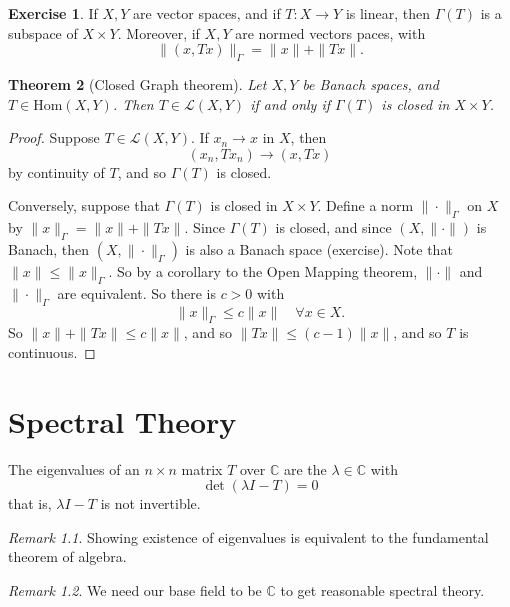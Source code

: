 \documentclass[10pt, oneside, reqno]{amsbook}
\theoremstyle{plain}%
\newtheorem{thm}{Theorem}[section]
\theoremstyle{definition}
\newtheorem{exer}[thm]{Exercise}
\theoremstyle{remark}
\newtheorem*{rem}{Remark}
\newcommand{\Com}{\mathbb{C}}
\begin{document}

\begin{exer}
    If $X, Y$ are vector spaces, and if $T: X \rightarrow Y$ is linear, then $\Gamma(T)$ is a subspace of $X \times Y$.  Moreover, if $X, Y$ are normed vectors paces, with \[
        \| (x, Tx) \|_\Gamma = \| x \| + \| Tx \|.
    \]  
\end{exer}

\begin{thm}[Closed Graph theorem]
    Let $X, Y$ be Banach spaces, and $T \in \text{Hom}(X,Y)$.  Then $T \in \mathcal L(X,Y)$ if and only if $\Gamma(T)$ is closed in $X \times Y$.  
\end{thm}

\begin{proof}
    Suppose $T \in \mathcal L(X,Y)$.  If $x_n \rightarrow x$ in $X$, then \[
        (x_n, Tx_n) \rightarrow (x, Tx)
    \] by continuity of $T$, and so $\Gamma(T)$ is closed.
    
    Conversely, suppose that $\Gamma(T)$ is closed in $X \times Y$.  Define a norm $\| \cdot \|_\Gamma$ on $X$ by $\| x \|_\Gamma = \| x \| + \| Tx \|$.  Since $\Gamma(T)$ is closed, and since $(X, \| \cdot \|)$ is Banach, then $(X, \| \cdot \|_\Gamma)$ is also a Banach space (exercise).  Note that $\| x \| \leq \| x \|_\Gamma$.  So by a corollary to the Open Mapping theorem, $\| \cdot \|$ and $\| \cdot \|_\Gamma$ are equivalent.  So there is $c > 0$ with \[
        \| x \|_\Gamma \leq c \| x \| \quad \forall x \in X.
    \]    So $\| x \| + \| Tx \| \leq c \| x \|$, and so $\| Tx \| \leq (c-1) \| x \|$, and so $T$ is continuous.
\end{proof}

\chapter{Spectral Theory}
The eigenvalues of an $n \times n$ matrix $T$ over $\Com$ are the $\lambda \in \Com$ with \[
    \det(\lambda I - T) = 0
\] that is, $\lambda I - T$ is not invertible.

\begin{rem}
    Showing existence of eigenvalues is equivalent to the fundamental theorem of algebra.  
\end{rem}
\begin{rem}
    We need our base field to be $\Com$ to get reasonable spectral theory.
\end{rem}
\end{document}
